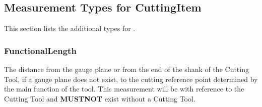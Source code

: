 \subsection{Measurement Types for CuttingItem} \label{sec:Measurement Types for CuttingItem}


This section lists the additional  types for .


\subsubsection{FunctionalLength}




The distance from the gauge plane or from the end of the shank of the Cutting Tool, if a gauge plane does not exist, to the cutting reference point determined by the main function of the tool. This measurement will be with reference to the Cutting Tool and \textbf{MUSTNOT} exist without a Cutting Tool.


